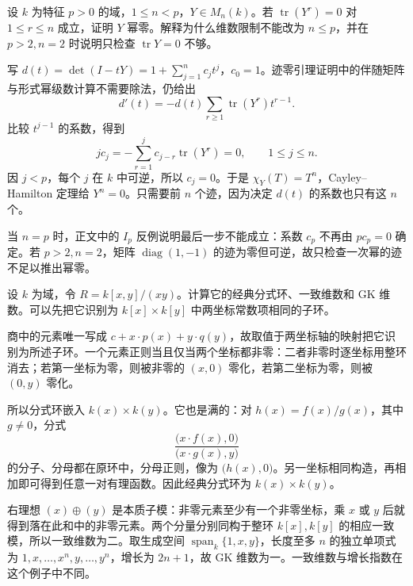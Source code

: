 \begin{optionalexercise}\label{b2:ex:19-trace-positive-characteristic}
	设 \(k\) 为特征 \(p>0\) 的域，\(1\le n<p\)，\(Y\in M_n(k)\)。若 \(\operatorname{tr}(Y^r)=0\) 对 \(1\le r\le n\) 成立，证明 \(Y\) 幂零。解释为什么维数限制不能改为 \(n\le p\)，并在 \(p>2,n=2\) 时说明只检查 \(\operatorname{tr}Y=0\) 不够。
\end{optionalexercise}
\begin{solution}
	写 \(d(t)=\det(I-tY)=1+\sum_{j=1}^n c_jt^j\)，\(c_0=1\)。迹零引理证明中的伴随矩阵与形式幂级数计算不需要除法，仍给出
	\[
		d'(t)=-d(t)\sum_{r\ge1}\operatorname{tr}(Y^r)t^{r-1}.
	\]
	比较 \(t^{j-1}\) 的系数，得到
	\[
		jc_j=-\sum_{r=1}^j c_{j-r}\operatorname{tr}(Y^r)=0, \qquad 1\le j\le n.
	\]
	因 \(j<p\)，每个 \(j\) 在 \(k\) 中可逆，所以 \(c_j=0\)。于是 \(\chi_Y(T)=T^n\)，Cayley--Hamilton 定理给 \(Y^n=0\)。只需要前 \(n\) 个迹，因为决定 \(d(t)\) 的系数也只有这 \(n\) 个。

	当 \(n=p\) 时，正文中的 \(I_p\) 反例说明最后一步不能成立：系数 \(c_p\) 不再由 \(pc_p=0\) 确定。若 \(p>2,n=2\)，矩阵 \(\operatorname{diag}(1,-1)\) 的迹为零但可逆，故只检查一次幂的迹不足以推出幂零。
\end{solution}

\begin{optionalexercise}\label{b2:ex:19-crossing-lines}
	设 \(k\) 为域，令 \(R=k[x,y]/(xy)\)。计算它的经典分式环、一致维数和 GK 维数。可以先把它识别为 \(k[x]\times k[y]\) 中两坐标常数项相同的子环。
\end{optionalexercise}
\begin{solution}
	商中的元素唯一写成 \(c+x\cdot p(x)+y\cdot q(y)\)，故取值于两坐标轴的映射把它识别为所述子环。一个元素正则当且仅当两个坐标都非零：二者非零时逐坐标用整环消去；若第一坐标为零，则被非零的 \((x,0)\) 零化，若第二坐标为零，则被 \((0,y)\) 零化。

	所以分式环嵌入 \(k(x)\times k(y)\)。它也是满的：对 \(h(x)=f(x)/g(x)\)，其中 \(g\ne0\)，分式
	\[
		\frac{\bigl(x\cdot f(x),0\bigr)}{\bigl(x\cdot g(x),y\bigr)}
	\]
	的分子、分母都在原环中，分母正则，像为 \(\bigl(h(x),0\bigr)\)。另一坐标相同构造，再相加即可得到任意一对有理函数。因此经典分式环为 \(k(x)\times k(y)\)。

	右理想 \((x)\oplus(y)\) 是本质子模：非零元素至少有一个非零坐标，乘 \(x\) 或 \(y\) 后就得到落在此和中的非零元素。两个分量分别同构于整环 \(k[x],k[y]\) 的相应一致模，所以一致维数为二。取生成空间 \(\operatorname{span}_k\{1,x,y\}\)，长度至多 \(n\) 的独立单项式为 \(1,x,\ldots,x^n,y,\ldots,y^n\)，增长为 \(2n+1\)，故 GK 维数为一。一致维数与增长指数在这个例子中不同。
\end{solution}

